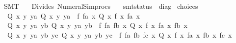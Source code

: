 %
\begin{isabellebody}%
%
%
\isadelimdocument
%
\endisadelimdocument
%
\isatagdocument
%
\isamarkuptrue%
%
\endisatagdocument
{\isafolddocument}%
%
\isadelimdocument
%
\endisadelimdocument
%
\isadelimtheory
%
\endisadelimtheory
%
\isatagtheory
{}\isamarkupfalse%
\ SMT\isanewline
\ \ \ Divides\ Numeral{\isacharunderscore}{\kern0pt}Simprocs\isanewline
\ \ \ {\isachardoublequoteopen}smt{\isacharunderscore}{\kern0pt}status{\isachardoublequoteclose}\ {\isacharcolon}{\kern0pt}{\isacharcolon}{\kern0pt}\ diag\isanewline
{}%
\endisatagtheory
{\isafoldtheory}%
%
\isadelimtheory
%
\endisadelimtheory
%
\isadelimdocument
%
\endisadelimdocument
%
\isatagdocument
%
\isamarkuptrue%
%
\endisatagdocument
{\isafolddocument}%
%
\isadelimdocument
%
\endisadelimdocument
{}\isamarkupfalse%
\ choices{\isacharcolon}{\kern0pt}\isanewline
\ \ {\isachardoublequoteopen}{\isasymAnd}Q{\isachardot}{\kern0pt}\ {\isasymforall}x{\isachardot}{\kern0pt}\ {\isasymexists}y\ ya{\isachardot}{\kern0pt}\ Q\ x\ y\ ya\ {\isasymLongrightarrow}\ {\isasymexists}f\ fa{\isachardot}{\kern0pt}\ {\isasymforall}x{\isachardot}{\kern0pt}\ Q\ x\ {\isacharparenleft}{\kern0pt}f\ x{\isacharparenright}{\kern0pt}\ {\isacharparenleft}{\kern0pt}fa\ x{\isacharparenright}{\kern0pt}{\isachardoublequoteclose}\isanewline
\ \ {\isachardoublequoteopen}{\isasymAnd}Q{\isachardot}{\kern0pt}\ {\isasymforall}x{\isachardot}{\kern0pt}\ {\isasymexists}y\ ya\ yb{\isachardot}{\kern0pt}\ Q\ x\ y\ ya\ yb\ {\isasymLongrightarrow}\ {\isasymexists}f\ fa\ fb{\isachardot}{\kern0pt}\ {\isasymforall}x{\isachardot}{\kern0pt}\ Q\ x\ {\isacharparenleft}{\kern0pt}f\ x{\isacharparenright}{\kern0pt}\ {\isacharparenleft}{\kern0pt}fa\ x{\isacharparenright}{\kern0pt}\ {\isacharparenleft}{\kern0pt}fb\ x{\isacharparenright}{\kern0pt}{\isachardoublequoteclose}\isanewline
\ \ {\isachardoublequoteopen}{\isasymAnd}Q{\isachardot}{\kern0pt}\ {\isasymforall}x{\isachardot}{\kern0pt}\ {\isasymexists}y\ ya\ yb\ yc{\isachardot}{\kern0pt}\ Q\ x\ y\ ya\ yb\ yc\ {\isasymLongrightarrow}\ {\isasymexists}f\ fa\ fb\ fc{\isachardot}{\kern0pt}\ {\isasymforall}x{\isachardot}{\kern0pt}\ Q\ x\ {\isacharparenleft}{\kern0pt}f\ x{\isacharparenright}{\kern0pt}\ {\isacharparenleft}{\kern0pt}fa\ x{\isacharparenright}{\kern0pt}\ {\isacharparenleft}{\kern0pt}fb\ x{\isacharparenright}{\kern0pt}\ {\isacharparenleft}{\kern0pt}fc\ x{\isacharparenright}{\kern0pt}{\isachardoublequoteclose}\isanewline

\end{isabellebody}
